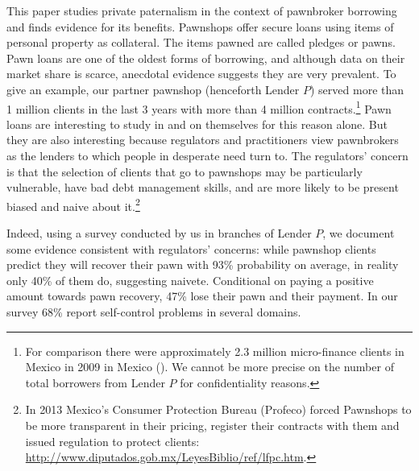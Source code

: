 \documentclass[11pt]{article}
\begin{document}
This paper studies private paternalism in the context of pawnbroker borrowing and finds evidence for its benefits. Pawnshops offer secure loans using items of personal property as collateral. The items pawned are called pledges or pawns. Pawn loans are one of the oldest forms of borrowing, and although data on their market share is scarce, anecdotal evidence suggests they are very prevalent. To give an example, our partner pawnshop (henceforth Lender $P$) served more than 1 million clients in the last 3 years with more than 4 million contracts.\footnote{For comparison there were approximately 2.3 million micro-finance clients in Mexico in 2009 in Mexico (\cite{Pedroza:2010}). We cannot be more precise on the number of total borrowers from Lender $P$ for confidentiality reasons.}  Pawn loans are interesting to study in and on themselves for this reason alone. But they are also interesting because regulators and practitioners view pawnbrokers as the lenders to which people in desperate need turn to. The regulators' concern is that the selection of clients that go to pawnshops may be particularly vulnerable, have bad debt management skills, and are more likely to be present biased and naive about it.\footnote{In 2013 Mexico's Consumer Protection Bureau (Profeco) forced Pawnshops to be more transparent in their pricing, register their contracts with them and issued regulation to protect clients: \url{http://www.diputados.gob.mx/LeyesBiblio/ref/lfpc.htm}.} 

Indeed, using a survey conducted by us in branches of Lender $P$, we document some evidence consistent with regulators' concerns: while pawnshop clients predict they will recover their pawn with 93\% probability on average, in reality only 40\% of them do, suggesting naivete. Conditional on paying a positive amount towards pawn recovery, 47\% lose their pawn and their payment. In our survey 68\% report self-control problems in several domains.%
\end{document}
